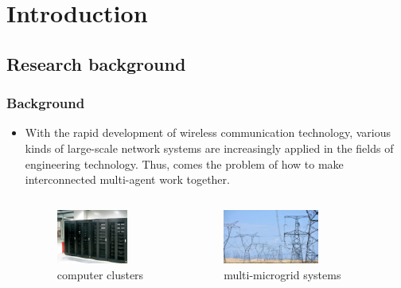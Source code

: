 \section{Introduction}\label{sec:1}

\subsection[Research background]{Research background}\label{subsec:1-1}
\begin{frame}
\frametitle{\normalsize{Background}}\transwipe
 \begin{itemize}
  \item With the rapid development of wireless communication technology, various kinds of large-scale network systems are increasingly applied in the fields of engineering technology. Thus, comes the problem of how to make interconnected multi-agent work together.
  \vspace{0.4cm}
  \begin{columns}[c]
 \column{6cm}
   \begin{figure}
       \includegraphics[height=0.7in]{figure/game/1-computer_cluster.jpg}
       \vspace{-6pt}
       \caption{computer clusters}
      \label{fig1}
   \end{figure}
    \column{6cm}
    \begin{figure}
      \includegraphics[height=0.7in]{figure/game/2-multi-microgrid.jpeg}
      \vspace{-6pt}
      \caption{multi-microgrid systems}
     \label{fig2} 
  \end{figure}
    \end{columns}


\end{itemize}
\end{frame}
